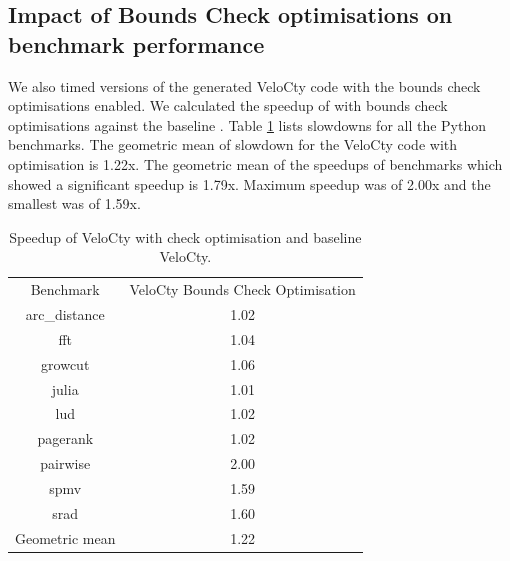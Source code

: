 \subsection{Impact of Bounds Check optimisations on benchmark performance}
We also timed versions of the generated VeloCty code with the bounds check optimisations enabled. We calculated the speedup of \velocty with bounds check optimisations against the baseline \velocty. Table \ref{tab:cwvscopy} lists slowdowns for all the Python benchmarks. The geometric mean of slowdown for the VeloCty code with optimisation is 1.22x. The geometric mean of the speedups of benchmarks which showed a significant speedup is 1.79x. Maximum speedup was of 2.00x and the smallest was of 1.59x. 
\begin{table}[h]
\centering
\begin{tabular}{|c|c|}
\hline
Benchmark      & VeloCty Bounds Check Optimisation \\ \hhline{|=|=|}
arc\_distance  & 1.02                              \\ \hline
fft            & 1.04                              \\ \hline
growcut        & 1.06                              \\ \hline
julia          & 1.01                              \\ \hline
lud            & 1.02                              \\ \hline
pagerank       & 1.02                              \\ \hline
pairwise       & 2.00                              \\ \hline
spmv           & 1.59                              \\ \hline
srad           & 1.60                              \\ \hline
Geometric mean & 1.22                              \\ \hline
\end{tabular}
\caption{Speedup of VeloCty with check optimisation and baseline VeloCty.}
\label{tab:cwvscopy}
\end{table}
